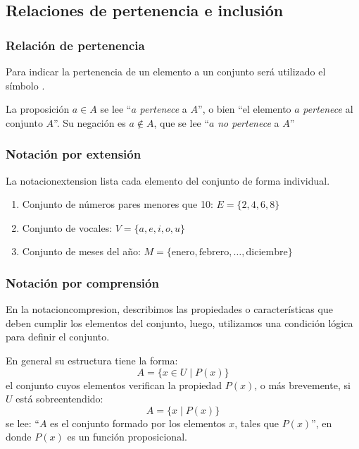 \subsection{Relaciones de pertenencia e inclusión}

\subsubsection{Relación de pertenencia}

Para indicar la \gls{pertenencia}  de un elemento a un conjunto será utilizado el símbolo .

La proposición $a \in A$ se lee ``$a$ \textit{pertenece} a $A$'', o bien ``el elemento $a$ \textit{pertenece} al conjunto $A$''. Su negación es $a \not \in A$, que se lee ``$a$ \textit{no pertenece} a $A$''

\subsubsection{Notación por extensión}

La \gls{notacionextension}  lista cada elemento del conjunto de forma individual.

\begin{fmd-example}
	\begin{enumerate}
		\item Conjunto de números pares menores que 10: $E = \{2, 4, 6, 8\}$
		\item Conjunto de vocales: \(V = \{a, e, i, o, u\}\)
		\item Conjunto de meses del año: \(M = \{\text{enero}, \text{febrero}, \ldots, \text{diciembre}\}\)
	\end{enumerate}
\end{fmd-example}

\subsubsection{Notación por comprensión}
En la \gls{notacioncompresion}, describimos las propiedades o características que deben cumplir los elementos del conjunto, luego, utilizamos una condición lógica para definir el conjunto.

En general su estructura tiene la forma:
\[ A = \{ x \in U \mid P(x) \}\]
el conjunto cuyos elementos verifican la propiedad $P(x)$, o más brevemente, si $U$ está sobreentendido:
\[ A = \{ x \mid P(x) \}\]
se lee: ``$A$ es el conjunto formado por los elementos $x$, tales que $P(x)$'', en donde $P(x)$ es un función proposicional.

